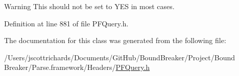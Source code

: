 \begin{DoxyWarning}{Warning}
This should not be set to {\ttfamily Y\+E\+S} in most cases. 
\end{DoxyWarning}


Definition at line 881 of file P\+F\+Query.\+h.



The documentation for this class was generated from the following file\+:\begin{DoxyCompactItemize}
\item 
/\+Users/jscottrichards/\+Documents/\+Git\+Hub/\+Bound\+Breaker/\+Project/\+Bound Breaker/\+Parse.\+framework/\+Headers/\hyperlink{_p_f_query_8h}{P\+F\+Query.\+h}\end{DoxyCompactItemize}
